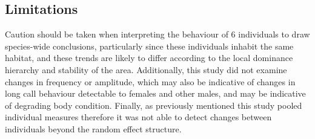 \subsection{Limitations}
Caution should be taken when interpreting the behaviour of 6 individuals to draw species-wide conclusions, particularly since these individuals inhabit the same habitat, and these trends are likely to differ according to the local dominance hierarchy and stability of the area. Additionally, this study did not examine changes in frequency or amplitude, which may also be indicative of changes in long call behaviour detectable to females and other males, and may be indicative of degrading body condition. Finally, as previously mentioned this study pooled individual measures therefore it was not able to detect changes between individuals beyond the random effect structure. 

